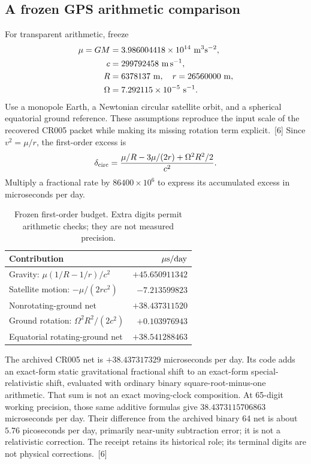 \documentclass[10pt,twocolumn,letterpaper]{article}
\begin{document}
\subsection{A frozen GPS arithmetic comparison}
For transparent arithmetic, freeze
\begin{align*}
 \mu=GM&=3.986004418\times 10^{14}\ {\rm m^3s^{-2}},\\
 c&=299792458\ {\rm m\,s^{-1}},\\
 R&=6378137\ {\rm m},\quad r=26560000\ {\rm m},\\
 \Omega&=7.292115\times 10^{-5}\ {\rm s^{-1}}.
\end{align*}
Use a monopole Earth, a Newtonian circular satellite orbit, and a spherical equatorial ground reference. These assumptions reproduce the input scale of the recovered CR005 packet while making its missing rotation term explicit.~[6] Since $v^2=\mu/r$, the first-order excess is
\begin{equation}
 \delta_{\rm circ}
 =\frac{\mu/R-3\mu/(2r)+\Omega^2R^2/2}{c^2}.
 \label{eq:circular-rate}
\end{equation}
Multiply a fractional rate by $86400\times 10^6$ to express its accumulated excess in microseconds per day.

\begin{table}[htbp]
\centering\small
\caption{Frozen first-order budget. Extra digits permit arithmetic checks; they are not measured precision.}
\begin{tabular}{@{}lr@{}}
\toprule
Contribution & $\mu{\rm s/day}$\\
\midrule
Gravity: $\mu(1/R-1/r)/c^2$ & $+45.650911342$\\
Satellite motion: $-\mu/(2rc^2)$ & $-7.213599823$\\
Nonrotating-ground net & $+38.437311520$\\
Ground rotation: $\Omega^2R^2/(2c^2)$ & $+0.103976943$\\
Equatorial rotating-ground net & $+38.541288463$\\
\bottomrule
\end{tabular}
\end{table}

The archived CR005 net is $+38.437317329$ microseconds per day. Its code adds an exact-form static gravitational fractional shift to an exact-form special-relativistic shift, evaluated with ordinary binary square-root-minus-one arithmetic. That sum is not an exact moving-clock composition. At 65-digit working precision, those same additive formulas give $38.4373115706863$ microseconds per day. Their difference from the archived binary 64 net is about $5.76$ picoseconds per day, primarily near-unity subtraction error; it is not a relativistic correction. The receipt retains its historical role; its terminal digits are not physical corrections.~[6]
\end{document}
